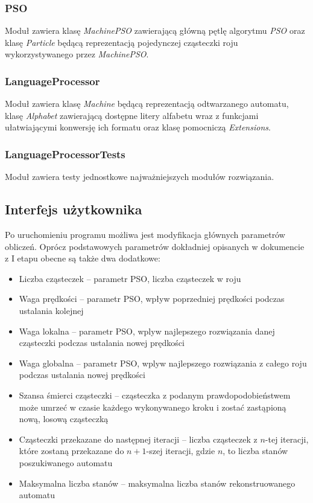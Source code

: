 \documentclass{../llncs_template_final/llncs}
\begin{document}
\subsubsection*{PSO}
Moduł zawiera klasę \emph{MachinePSO} zawierającą główną pętlę algorytmu \emph{PSO} oraz klasę \emph{Particle} będącą reprezentacją pojedynczej cząsteczki roju wykorzystywanego przez \emph{MachinePSO}.

\subsubsection*{LanguageProcessor}
Moduł zawiera klasę \emph{Machine} będącą reprezentacją odtwarzanego automatu, klasę \emph{Alphabet} zawierającą dostępne litery alfabetu wraz z funkcjami ułatwiającymi konwersję ich formatu oraz klasę pomocniczą \emph{Extensions}.

\subsubsection*{LanguageProcessorTests}
Moduł zawiera testy jednostkowe najważniejszych modułów rozwiązania.

\subsection{Interfejs użytkownika}
Po uruchomieniu programu możliwa jest modyfikacja głównych parametrów obliczeń. Oprócz podstawowych parametrów dokładniej opisanych w dokumencie z I etapu obecne są także dwa dodatkowe:

\begin{itemize}
\item Liczba cząsteczek -- parametr PSO, liczba cząsteczek w roju
\item Waga prędkości -- parametr PSO, wpływ poprzedniej prędkości podczas ustalania kolejnej
\item Waga lokalna -- parametr PSO, wplyw najlepszego rozwiązania danej cząsteczki podczas ustalania nowej prędkości
\item Waga globalna -- parametr PSO, wplyw najlepszego rozwiązania z całego roju podczas ustalania nowej prędkości
\item Szansa śmierci cząsteczki -- cząsteczka z podanym prawdopodobieństwem może umrzeć w czasie każdego wykonywanego kroku i zostać zastąpioną nową, losową cząsteczką
\item Cząsteczki przekazane do następnej iteracji -- liczba cząsteczek z $n$-tej iteracji, które zostaną przekazane do $n+1$-szej iteracji, gdzie $n$, to liczba stanów poszukiwanego automatu
\item Maksymalna liczba stanów -- maksymalna liczba stanów rekonstruowanego automatu
\end{itemize}
\end{document}
